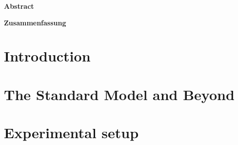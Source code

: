 \documentclass[a4paper, 12pt, twoside, openany]{ThesisStyle}
\begin{document}
\begin{titlepage}

\end{titlepage}

\newpage\thispagestyle{empty}\mbox{}
\newpage\thispagestyle{empty}\mbox{}

\vspace*{\fill}
\begin{center}
\Large
{\color{MidnightBlue}\textbf{Abstract}}

\end{center}
\vspace*{\fill}


\newpage\thispagestyle{empty}\mbox{}
\newpage\thispagestyle{empty}\mbox{}

\vspace*{\fill}
\begin{center}
\Large
{\color{MidnightBlue}\textbf{Zusammenfassung}}
\end{center}

\vspace*{\fill}

\newpage\thispagestyle{empty}\mbox{}
\setcounter{tocdepth}{2}
\setcounter{page}{0}
\tableofcontents
\setcounter{secnumdepth}{4}
\clearpage

\newpage
{}

\chapter*{Introduction}
\label{ch:Introduction}


\chapter{The Standard Model and Beyond} 
\label{ch:theory}
\vspace*{\fill}\newpage

\vspace*{\fill}\newpage

% 


\chapter{Experimental setup}
\label{ch:CMS}
\vspace*{\fill}\newpage

\end{document}
